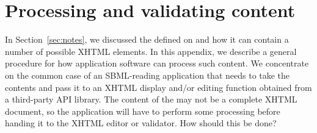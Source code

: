
\section{Processing and validating  content}
\label{apdx:processing-notes}

In Section~\ref{sec:notes}, we discussed the  
defined on \SBase and how it can contain a number of possible
XHTML elements.  In this appendix, we describe a general procedure
for how application software can process such content.  We
concentrate on the common case of an SBML-reading application that
needs to take the contents and pass it to an XHTML display and/or
editing function obtained from a third-party API library.  The
content of the  may not be a complete XHTML document,
so the application will have to perform some processing before
handing it to the XHTML editor or validator.  How should this be
done?

